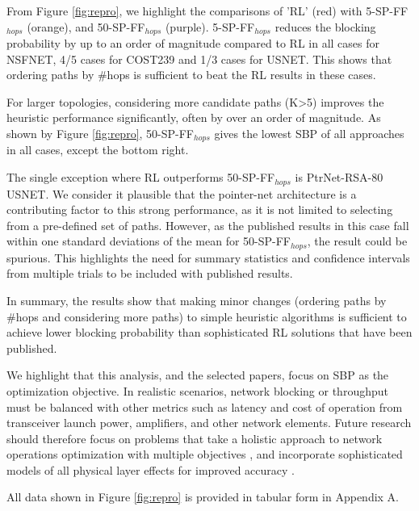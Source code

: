 From Figure \ref{fig:repro}, we highlight the comparisons of 'RL' (red) with 5-SP-FF$_{hops}$ (orange), and 50-SP-FF$_{hops}$ (purple). 5-SP-FF$_{hops}$ reduces the blocking probability by up to an order of magnitude compared to RL in all cases for NSFNET, 4/5 cases for COST239 and 1/3 cases for USNET. This shows that ordering paths by \#hops is sufficient to beat the RL results in these cases.

For larger topologies, considering more candidate paths (K>5) improves the heuristic performance significantly, often by over an order of magnitude. As shown by Figure \ref{fig:repro}, 50-SP-FF$_{hops}$ gives the lowest SBP of all approaches in all cases, except the bottom right.

The single exception where RL outperforms 50-SP-FF$_{hops}$ is PtrNet-RSA-80 USNET. We consider it plausible that the pointer-net architecture is a contributing factor to this strong performance, as it is not limited to selecting from a pre-defined set of paths. However, as the published results in this case fall within one standard deviations of the mean for 50-SP-FF$_{hops}$, the result could be spurious. This highlights the need for summary statistics and confidence intervals from multiple trials to be included with published results.

In summary, the results show that making minor changes (ordering paths by \#hops and considering more paths)  to simple heuristic algorithms is sufficient to achieve lower blocking probability than sophisticated RL solutions that have been published.

We highlight that this analysis, and the selected papers, focus on SBP as the optimization objective. In realistic scenarios, network blocking or throughput must be balanced with other metrics such as latency and cost of operation from transceiver launch power, amplifiers, and other network elements. Future research should therefore focus on problems that take a holistic approach to network operations optimization with multiple objectives \cite{nallaperuma_interpreting_2023}, and incorporate sophisticated models of all physical layer effects for improved accuracy \cite{curri_gnpy_2022,buglia_closed-form_2023}.



All data shown in Figure \ref{fig:repro} is provided in tabular form in Appendix A.

